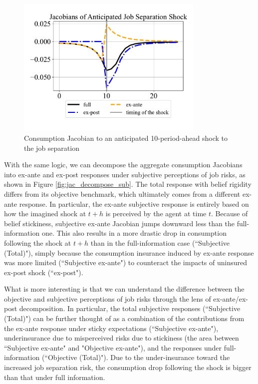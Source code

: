 \begin{figure}[pt]
    \centering
    \caption{Consumption Jacobian to an anticipated 10-period-ahead shock to the job separation}
    \label{fig:jac_decompose}
\includegraphics[width=0.8\textwidth]{text/chapter2/Figures/JS_decomposition.pdf} 
\end{figure}

With the same logic, we can decompose the aggregate consumption Jacobians into ex-ante and ex-post responses under subjective perceptions of job risks, as shown in Figure \ref{fig:jac_decompose_sub}. The total response with belief rigidity differs from its objective benchmark, which ultimately comes from a different ex-ante response. In particular, the ex-ante subjective response is entirely based on how the imagined shock at $t+h$ is perceived by the agent at time $t$. Because of belief stickiness, subjective ex-ante Jacobian jumps downward less than the full-information one. This also results in a more drastic drop in consumption following the shock at $t+h$ than in the full-information case (``Subjective (Total)"), simply because the consumption insurance induced by ex-ante response was more limited (``Subjective ex-ante") to counteract the impacts of uninsured ex-post shock (``ex-post").


What is more interesting is that we can understand the difference between the objective and subjective perceptions of job risks through the lens of ex-ante/ex-post decomposition. In particular, the total subjective responses (``Subjective (Total)") can be further thought of as a combination of the contributions from the ex-ante response under sticky expectations (``Subjective ex-ante"), underinsurance due to misperceived risks due to stickiness (the area between ``Subjective ex-ante" and "Objective ex-ante"), and the responses under full-information (``Objective (Total)"). Due to the under-insurance toward the increased job separation risk, the consumption drop following the shock is bigger than that under full information.  


